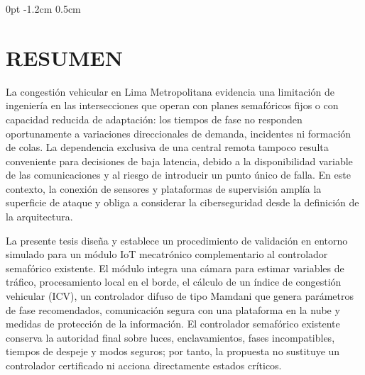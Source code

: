 \documentclass[12pt,a4paper,oneside]{report}
\numberwithin{figure}{chapter}
\numberwithin{table}{chapter}
\numberwithin{equation}{chapter}
\DeclareRobustCommand{\%}{\ifmmode\text{\char37\relax}\else\char37\relax\fi}%
\begin{document}
\clearpage
\begingroup

\titlespacing*{\chapter}
  {0pt}      %
  {-1.2cm}   %
  {0.5cm}    %
\chapter*{RESUMEN}\label{resumen}

La congestión vehicular en Lima Metropolitana evidencia una limitación de ingeniería en las intersecciones
que operan con planes semafóricos fijos o con capacidad reducida de adaptación: los tiempos de fase no
responden oportunamente a variaciones direccionales de demanda, incidentes ni formación de colas. La
dependencia exclusiva de una central remota tampoco resulta conveniente para decisiones de baja latencia,
debido a la disponibilidad variable de las comunicaciones y al riesgo de introducir un punto único de
falla. En este contexto, la conexión de sensores y plataformas de supervisión amplía la superficie de
ataque y obliga a considerar la ciberseguridad desde la definición de la arquitectura.

La presente tesis diseña y establece un procedimiento de validación en entorno simulado para un módulo IoT
mecatrónico complementario al controlador semafórico existente. El módulo integra una cámara para estimar
variables de tráfico, procesamiento local en el borde, el cálculo de un índice de congestión vehicular
(ICV), un controlador difuso de tipo Mamdani que genera parámetros de fase recomendados, comunicación
segura con una plataforma en la nube y medidas de protección de la información. El controlador semafórico
existente conserva la autoridad final sobre luces, enclavamientos, fases incompatibles, tiempos de despeje
y modos seguros; por tanto, la propuesta no sustituye un controlador certificado ni acciona directamente
estados críticos.
\end{document}
